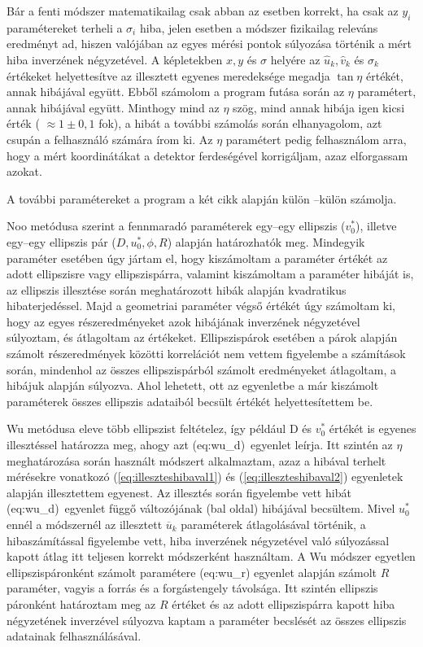 \documentclass[a4paper,12pt]{article}
\begin{document}
Bár a fenti módszer matematikailag csak abban az esetben korrekt, ha  csak az  $y_i$ paramétereket terheli a $\sigma_i$ hiba, jelen esetben  a módszer fizikailag releváns eredményt ad, hiszen valójában az egyes mérési pontok súlyozása történik a mért hiba inverzének négyzetével. A képletekben $x,y$ és $\sigma$ helyére az $\hat{u}_k, \hat{v}_k$ és $\hat{\sigma}_k$ értékeket helyettesítve az illesztett egyenes meredeksége megadja $\tan \eta$ értékét, annak hibájával együtt. Ebből számolom a program futása során az $\eta$ paramétert, annak hibájával együtt. Minthogy mind az $\eta$ szög, mind annak hibája igen kicsi érték ( $\approx 1\pm 0\!,1$ fok), a hibát a további számolás során elhanyagolom, azt csupán a felhasználó számára írom ki. Az $\eta$ paramétert pedig felhasználom arra, hogy a mért koordinátákat a detektor ferdeségével korrigáljam, azaz elforgassam azokat.


A további paramétereket a program a két cikk alapján külön --külön számolja. 

Noo metódusa szerint a fennmaradó paraméterek egy--egy ellipszis ($v_0^*$), illetve egy--egy ellipszis pár ($D, u_0^*, \phi, R$) alapján határozhatók meg.  Mindegyik paraméter esetében úgy jártam el, hogy kiszámoltam a paraméter értékét az adott ellipszisre vagy ellipszispárra, valamint kiszámoltam a paraméter hibáját is, az ellipszis illesztése során meghatározott hibák alapján kvadratikus hibaterjedéssel. Majd a geometriai paraméter végső értékét úgy számoltam ki, hogy az egyes részeredményeket azok hibájának inverzének négyzetével súlyoztam, és átlagoltam az értékeket. Ellipszispárok esetében a párok alapján számolt részeredmények közötti korrelációt nem vettem figyelembe a számítások során, mindenhol az összes ellipszispárból számolt eredményeket átlagoltam, a hibájuk alapján súlyozva. Ahol lehetett, ott az egyenletbe a már kiszámolt paraméterek összes ellipszis adataiból becsült értékét helyettesítettem be.

Wu metódusa eleve több ellipszist feltételez, így például D és $v_0^*$ értékét is egyenes illesztéssel határozza meg, ahogy azt \aref({eq:wu_d})~egyenlet leírja. Itt szintén az $\eta$ meghatározása során használt módszert alkalmaztam, azaz a hibával terhelt mérésekre vonatkozó (\ref{eq:illeszteshibaval1}) és (\ref{eq:illeszteshibaval2}) egyenletek alapján illesztettem egyenest. Az illesztés során figyelembe vett hibát \aref({eq:wu_d})~egyenlet függő változójának (bal oldal) hibájával becsültem.  Mivel $u_0^*$ ennél a módszernél az illesztett $\overline{u}_k$ paraméterek átlagolásával történik, a hibaszámítással figyelembe vett, hiba inverzének négyzetével való súlyozással kapott átlag itt teljesen korrekt módszerként használtam. A Wu módszer egyetlen ellipszispáronként számolt paramétere  \Aref({eq:wu_r}) egyenlet alapján számolt $R$ paraméter, vagyis a forrás és a forgástengely távolsága. Itt szintén ellipszis páronként határoztam meg az $R$ értéket és az adott ellipszispárra kapott hiba négyzetének inverzével súlyozva  kaptam a paraméter becslését az összes ellipszis adatainak felhasználásával. 
\end{document}
